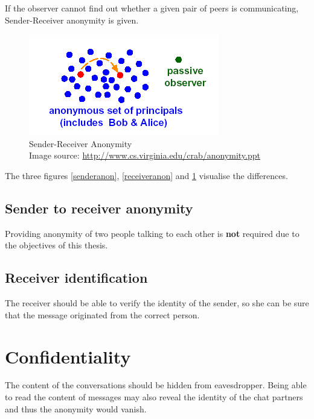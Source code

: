 If the observer cannot find out whether a given pair of peers
is communicating, Sender-Receiver anonymity is given.
\begin{figure}
    \centering
    \caption[Sender-Receiver Anonymity]{Sender-Receiver Anonymity\\Image source: \protect\url{http://www.cs.virginia.edu/crab/anonymity.ppt}}
    \label{senderreceiveranon}
    \includegraphics[scale=0.8]{sender-receiver-anon.png}
\end{figure}
The three figures \ref{senderanon}, \ref{receiveranon} and
\ref{senderreceiveranon} visualise the differences.
\subsection{Sender to receiver anonymity}
Providing anonymity of two people talking to each other is \textbf{not} 
required due to the objectives of this thesis.
\subsection{Receiver identification}
The receiver should be able to verify the identity of the sender, so she
can be sure that the message originated from the correct person.
\section{Confidentiality}
The content of the conversations should be hidden from eavesdropper.
Being able to read the content of messages may also reveal the identity
of the chat partners and thus the anonymity would vanish.

% 
